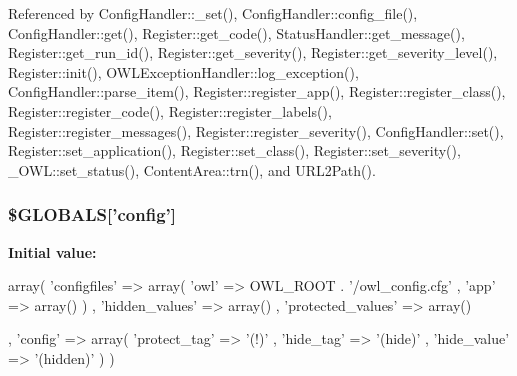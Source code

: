 Referenced by ConfigHandler::\_\-set(), ConfigHandler::config\_\-file(), ConfigHandler::get(), Register::get\_\-code(), StatusHandler::get\_\-message(), Register::get\_\-run\_\-id(), Register::get\_\-severity(), Register::get\_\-severity\_\-level(), Register::init(), OWLExceptionHandler::log\_\-exception(), ConfigHandler::parse\_\-item(), Register::register\_\-app(), Register::register\_\-class(), Register::register\_\-code(), Register::register\_\-labels(), Register::register\_\-messages(), Register::register\_\-severity(), ConfigHandler::set(), Register::set\_\-application(), Register::set\_\-class(), Register::set\_\-severity(), \_\-OWL::set\_\-status(), ContentArea::trn(), and URL2Path().

\subsubsection[{\$GLOBALS}]{\setlength{\rightskip}{0pt plus 5cm}\$GLOBALS\mbox{[}'config'\mbox{]}}\label{config_8php_ab954a2cc6c5b7053b6cabb0c8dea38d1}
{\bfseries Initial value:}
\begin{DoxyCode}
 array(
          'configfiles'                 => array(
                                  'owl' => OWL_ROOT . '/owl_config.cfg'
                                , 'app' => array()
        )
        , 'hidden_values'               => array()
        , 'protected_values'    => array()

        , 'config'                              => array(
                                  'protect_tag' => '(!)'
                                , 'hide_tag'    => '(hide)'
                                , 'hide_value'  => '(hidden)'
        )
)
\end{DoxyCode}
